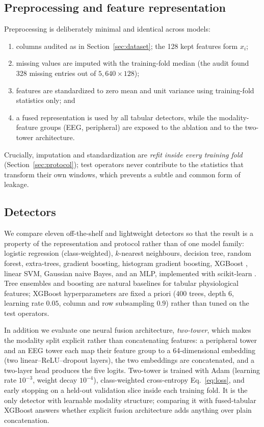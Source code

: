 \documentclass{llncs}
\begin{document}
\subsection{Preprocessing and feature representation}

Preprocessing is deliberately minimal and identical across models:
\begin{enumerate}
\item columns audited as in Section~\ref{sec:dataset}; the 128 kept features form
$x_i$;
\item missing values are imputed with the training-fold median (the audit found 328
missing entries out of $5{,}640\times128$);
\item features are standardized to zero mean and unit variance using training-fold
statistics only; and
\item a fused representation is used by all tabular detectors, while the
modality-feature groups (\ac{EEG}, peripheral) are exposed to the ablation and to the
two-tower architecture.
\end{enumerate}
Crucially, imputation and standardization are \emph{refit inside every training fold}
(Section~\ref{sec:protocol}); test operators never contribute to the statistics that
transform their own windows, which prevents a subtle and common form of leakage.

\subsection{Detectors}

We compare eleven off-the-shelf and lightweight detectors so that the result is a
property of the representation and protocol rather than of one model family:
logistic regression (class-weighted), $k$-nearest neighbours, decision tree, random
forest, extra-trees, gradient boosting, histogram gradient boosting,
\ac{XGBoost} \cite{chen2016xgboost}, linear \ac{SVM}, Gaussian naive Bayes, and an
\ac{MLP}, implemented with scikit-learn \cite{pedregosa2011scikit}. Tree ensembles
and boosting are natural baselines for tabular physiological features; \ac{XGBoost} hyperparameters are fixed a priori ($400$ trees, depth $6$,
learning rate $0.05$, column and row subsampling $0.9$) rather than tuned on the test
operators.

In addition we evaluate one neural fusion architecture, \emph{two-tower}, which makes
the modality split explicit rather than concatenating features: a peripheral tower
and an \ac{EEG} tower each map their feature group to a 64-dimensional embedding
(two linear--ReLU--dropout layers), the two embeddings are concatenated, and a
two-layer head produces the five logits. Two-tower is trained with Adam (learning
rate $10^{-3}$, weight decay $10^{-4}$), class-weighted cross-entropy
Eq.~\eqref{eq:loss}, and early stopping on a held-out validation slice inside each
training fold. It is the only detector with learnable modality structure; comparing
it with fused-tabular \ac{XGBoost} answers whether explicit fusion architecture adds
anything over plain concatenation.
\end{document}
